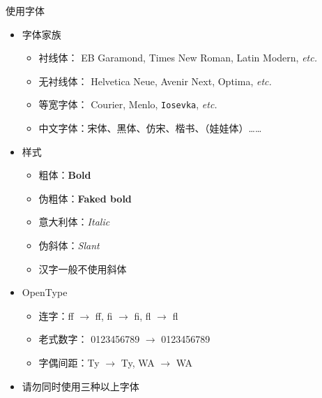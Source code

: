 \begin{frame}{使用字体}
\begin{itemize}
  \item<1-> 字体家族

    \begin{itemize}
      \item 衬线体：
        {\EBGaramond EB Garamond},
        {\TimesNewRoman Times New Roman},
        {\LatinRoman Latin Modern}, \emph{etc.}
      \item 无衬线体：
        {\Helvetica Helvetica Neue},
        {\Avenir Avenir Next},
        {\Optima Optima}, \emph{etc.}
      \item 等宽字体：
        {\Courier Courier},
        {\Menlo Menlo},
        \texttt{Iosevka}, \emph{etc.}
      \item 中文字体：宋体、{\HeiTi 黑体}、{\FangSong 仿宋}、{\KaiTi 楷书}、{\WaWa （娃娃体）}……
    \end{itemize}

  \item<2-> 样式

    \begin{itemize}
      \item 粗体：\textbf{Bold}
      \item 伪粗体：{\textbf{Faked bold}}
      \item 意大利体：\textit{Italic}
      \item 伪斜体：{\textsl{Slant}}
      \item<3-> \alert{汉字一般不使用斜体}
    \end{itemize}

  \item<4-> OpenType

    \begin{itemize}
      \item 连字：{f}{f} $\to$ ff, {f}{i} $\to$ fi, {f}{l} $\to$ fl
      \item 老式数字：
        0123456789 $\to$ {0123456789}
      \item 字偶间距：{T}{y} $\to$ Ty, {W}{A} $\to$ WA
    \end{itemize}

  \item<5-> \alert{请勿同时使用三种以上字体}
\end{itemize}
\vspace{-0.2cm}
\end{frame}
